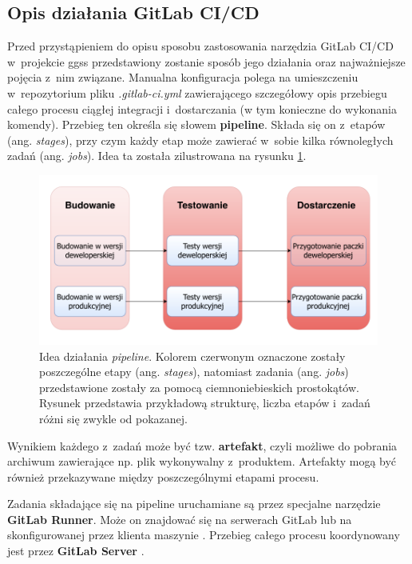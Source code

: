 \subsection{Opis działania GitLab CI/CD}
Przed przystąpieniem do opisu sposobu zastosowania narzędzia GitLab CI/CD w~projekcie \gls*{ggss} przedstawiony zostanie sposób jego działania oraz najważniejsze pojęcia z~nim związane. Manualna konfiguracja polega na umieszczeniu w~repozytorium pliku \textit{.gitlab-ci.yml} zawierającego szczegółowy opis przebiegu całego procesu ciągłej integracji i~dostarczania (w tym konieczne do wykonania komendy). Przebieg ten określa się słowem \textbf{pipeline}. Składa się on z~etapów (ang. \textit{stages}), przy czym każdy etap może zawierać w~sobie kilka równoległych zadań (ang. \textit{jobs}). Idea ta została zilustrowana na rysunku \ref{fig:pipeline}.

\begin{figure}
\centering
\includegraphics[width=\textwidth]{res/Pipeline.pdf}
\caption{Idea działania \textit{pipeline}. Kolorem czerwonym oznaczone zostały poszczególne etapy (ang. \textit{stages}), natomiast zadania (ang. \textit{jobs}) przedstawione zostały za pomocą ciemnoniebieskich prostokątów. Rysunek przedstawia przykładową strukturę, liczba etapów i~zadań różni się zwykle od pokazanej.}
\label{fig:pipeline}
\end{figure}

Wynikiem każdego z~zadań może być tzw. \textbf{artefakt}, czyli możliwe do pobrania archiwum zawierające np. plik wykonywalny z~produktem. Artefakty mogą być również przekazywane między poszczególnymi etapami procesu. 

Zadania składające się na pipeline uruchamiane są przez specjalne narzędzie \textbf{GitLab Runner}. Może on znajdować się na serwerach GitLab lub na skonfigurowanej przez klienta maszynie \cite{CIzGitLab}. Przebieg całego procesu koordynowany jest przez \textbf{GitLab Server} \cite{GitLabPage}.

